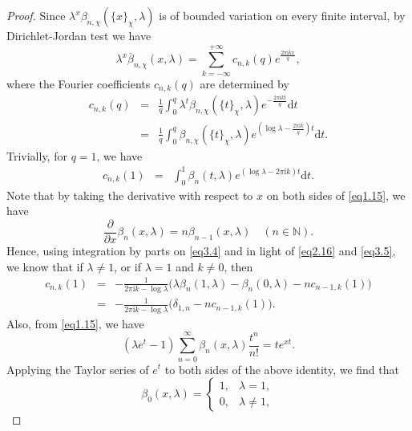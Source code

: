 \documentclass[10pt,a4paper]{amsart}
\begin{document}
\begin{proof}
Since $\lambda^{x}\beta_{n,\chi}(\{x\}_{\chi},\lambda)$ is of bounded variation on every finite interval, by Dirichlet-Jordan test we have
\begin{equation}\label{eq3.2}
\lambda^{x}\overline{\beta}_{n,\chi}(x,\lambda)=\sum_{k=-\infty}^{+\infty}c_{n,k}(q)e^{\frac{2\pi\mathrm{i}kx}{q}},
\end{equation}
where the Fourier coefficients $c_{n,k}(q)$ are determined by
\begin{eqnarray}\label{eq3.3}
c_{n,k}(q)&=&\frac{1}{q}\int_{0}^{q}\lambda^{t}\beta_{n,\chi}(\{t\}_{\chi},\lambda)e^{-\frac{2\pi\mathrm{i}kt}{q}}\text{d}t\nonumber\\
&=&\frac{1}{q}\int_{0}^{q}\beta_{n,\chi}(\{t\}_{\chi},\lambda)e^{(\log\lambda-\frac{2\pi\mathrm{i}k}{q})t}\text{d}t.
\end{eqnarray}
Trivially, for $q=1$, we have
\begin{eqnarray}\label{eq3.4}
c_{n,k}(1)&=&\int_{0}^{1}\beta_{n}(t,\lambda)e^{(\log\lambda-2\pi\mathrm{i}k)t}\text{d}t.
\end{eqnarray}
Note that by taking the derivative with respect to $x$ on both sides of \eqref{eq1.15}, we have
\begin{equation}\label{eq3.5}
\frac{\partial}{\partial x}\beta_{n}(x,\lambda)=n\beta_{n-1}(x,\lambda)\quad(n\in\mathbb{N}).
\end{equation}
Hence, using integration by parts on \eqref{eq3.4} and in light of \eqref{eq2.16} and \eqref{eq3.5}, we know that if $\lambda\neq1$, or if $\lambda=1$ and $k\neq0$, then
\begin{eqnarray}\label{eq3.6}
c_{n,k}(1)&=&-\frac{1}{2\pi\mathrm{i}k-\log\lambda}\bigl(\lambda\beta_{n}(1,\lambda)-\beta_{n}(0,\lambda)-nc_{n-1,k}(1)\bigl)\nonumber\\
&=&-\frac{1}{2\pi\mathrm{i}k-\log\lambda}\bigl(\delta_{1,n}-nc_{n-1,k}(1)\bigl).
\end{eqnarray}
Also, from \eqref{eq1.15}, we have
\begin{equation*}
(\lambda e^{t}-1)\sum_{n=0}^{\infty}\beta_{n}(x,\lambda)\frac{t^{n}}{n!}=te^{xt}.
\end{equation*}
Applying the Taylor series of $e^{t}$ to both sides of the above identity, we find that
\begin{equation}\label{eq3.7}
\beta_{0}(x,\lambda)=\begin{cases}
1,  &\lambda=1,\\
0,  &\lambda\not=1,
\end{cases}

\end{equation}
\end{proof}
\end{document}
